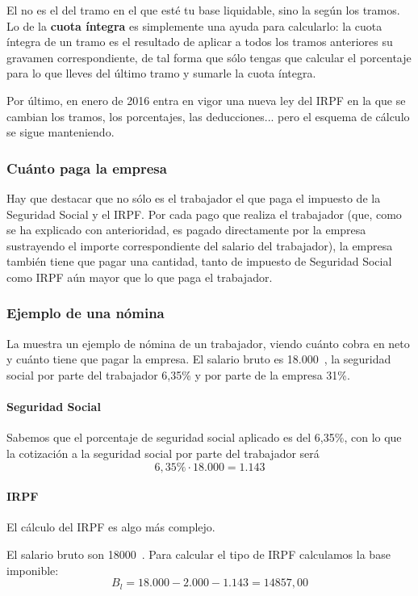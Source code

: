 \documentclass[nochap,palatino,shortheader]{apuntes}
\begin{document}
El  no es el del tramo en el que esté tu base liquidable, sino la  según los tramos.
Lo de la \textbf{cuota íntegra} es simplemente una ayuda para calcularlo: la cuota íntegra de un tramo es el resultado de aplicar a todos los tramos anteriores su gravamen correspondiente, de tal forma que sólo tengas que calcular el porcentaje para lo que lleves del último tramo y sumarle la cuota íntegra.

Por último, en enero de 2016 entra en vigor una nueva ley del IRPF en la que se cambian los tramos, los porcentajes, las deducciones... pero el esquema de cálculo se sigue manteniendo.

\subsubsection{Cuánto paga la empresa}
Hay que destacar que no sólo es el trabajador el que paga el impuesto de la Seguridad Social y el IRPF. Por cada pago que realiza el trabajador (que, como se ha explicado con anterioridad, es pagado directamente por la empresa sustrayendo el importe correspondiente del salario del trabajador), la empresa también tiene que pagar una cantidad, tanto de impuesto de Seguridad Social como IRPF aún mayor que lo que paga el trabajador.

\subsubsection{Ejemplo de una nómina}
La  muestra un ejemplo de nómina de un trabajador, viendo cuánto cobra en neto y cuánto tiene que pagar la empresa. El salario bruto es 18.000\texteuro\ , la seguridad social por parte del trabajador 6,35\% y por parte de la empresa 31\%.


\paragraph{Seguridad Social}
Sabemos que el porcentaje de seguridad social aplicado es del 6,35\%, con lo que la cotización a la seguridad social por parte del trabajador será
\[6,35\% · 18.000 = 1.143\]

\paragraph{IRPF} El cálculo del IRPF es algo más complejo.


El salario bruto son 18000\texteuro\ . Para calcular el tipo de IRPF calculamos la base imponible:
\[
B_l = 18.000 - 2.000 - 1.143 = 14857,00
\]
\end{document}
